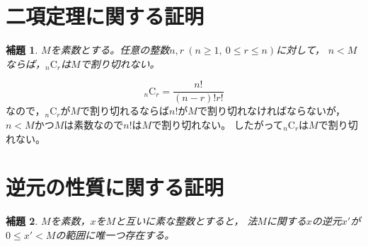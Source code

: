 \documentclass{article}
\makeatletter
\renewenvironment{proof}[1][\proofname]{\par
        \pushQED{\qed}
        \normalfont
        \topsep6\p@\@plus6\p@ \trivlist
        \item[\hskip\labelsep{\bfseries #1}\@addpunct{\bfseries}]\ignorespaces
    }{%
        \popQED\endtrivlist\@endpefalse
    }
\renewcommand{\proofname}{証明.}
\newtheorem{lemma}{補題}
\newcommand{\combination}[2]{{}_{#1} \mathrm{C}_{#2}}
\makeatother
\begin{document}
\section{二項定理に関する証明}

\begin{screen}
    \begin{lemma}
        \label{lemma:c:1}
        $M$を素数とする。任意の整数$n, r\ (n \geq 1,\ 0 \leq r \leq n)$に対して，
        $n < M$ならば，$\combination{n}{r}$は$M$で割り切れない。
    \end{lemma}
\end{screen}

\begin{proof}
    \begin{equation}
        \combination{n}{r} = \frac{n!}{(n - r)! r!}
    \end{equation}
    なので，$\combination{n}{r}$が$M$で割り切れるならば$n!$が$M$で割り切れなければならないが，
    $n < M$かつ$M$は素数なので$n!$は$M$で割り切れない。
    したがって$\combination{n}{r}$は$M$で割り切れない。
\end{proof}


\section{逆元の性質に関する証明}

\begin{screen}
    \begin{lemma}
        \label{lemma:inv:1}
        $M$を素数，$x$を$M$と互いに素な整数とすると，
        法$M$に関する$x$の逆元$x'$が$0 \leq x' < M$の範囲に唯一つ存在する。
    \end{lemma}
\end{screen}
\end{document}
